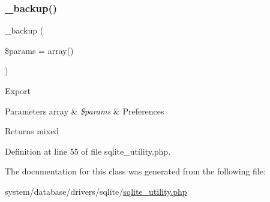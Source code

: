 \subsubsection{\texorpdfstring{\_backup()}{\_backup()}}
{\footnotesize\ttfamily \+\_\+backup (\begin{DoxyParamCaption}\item[{}]{\$params = {\ttfamily array()} }\end{DoxyParamCaption})\hspace{0.3cm}{\ttfamily [protected]}}

Export


\begin{DoxyParams}[1]{Parameters}
array & {\em \$params} & Preferences \\
\hline
\end{DoxyParams}
\begin{DoxyReturn}{Returns}
mixed 
\end{DoxyReturn}


Definition at line 55 of file sqlite\+\_\+utility.\+php.



The documentation for this class was generated from the following file\+:\begin{DoxyCompactItemize}
\item 
system/database/drivers/sqlite/\mbox{\hyperlink{sqlite__utility_8php}{sqlite\+\_\+utility.\+php}}\end{DoxyCompactItemize}
